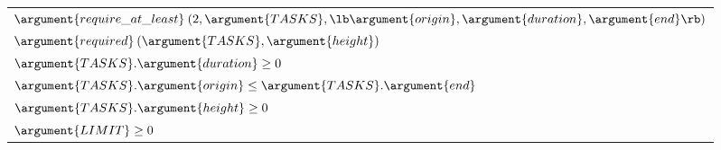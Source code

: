 \begin{ctrdesc}
{\begin{minipage}[t]{11.2cm}
\end{minipage}}
\item[\pdfmarkup{subject={Restrictions},color=white,markup=Highlight}{Restrictions}{Additional conditions refining the type declarations of one or several arguments of the constraint.}]
\colorbox{MyAzurelight}{\begin{minipage}[t]{11.2cm}
\begin{tabular}[t]{l}
$ $\hyperlink{PR_require_at_least}{$\argument{require\_at\_least}$}$ (2,\argument{TASKS},\lb\argument{origin},\argument{duration},\argument{end}\rb)$\\
$ $\hyperlink{PR_required}{$\argument{required}$}$ (\argument{TASKS},\argument{height})$\\
$\argument{TASKS}.\argument{duration}\geq 0$\\
$\argument{TASKS}.\argument{origin}\leq \argument{TASKS}.\argument{end}$\\
$\argument{TASKS}.\argument{height}\geq 0$\\
$\argument{LIMIT}\geq 0$\\
\end{tabular}

\end{minipage}}
\item[\pdfmarkup{subject={Purpose},color=white,markup=Highlight}{Purpose}{Definition in natural language of the meaning of the constraint.}]
{\setlength\fboxrule{1.5pt}}
\end{ctrdesc}
